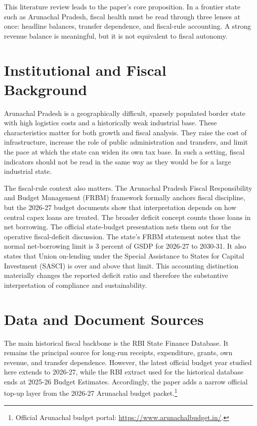 \documentclass[11pt,a4paper]{article}
\begin{document}
This literature review leads to the paper's core proposition. In a frontier state such as Arunachal Pradesh, fiscal health must be read through three lenses at once: headline balances, transfer dependence, and fiscal-rule accounting. A strong revenue balance is meaningful, but it is not equivalent to fiscal autonomy.

\section{Institutional and Fiscal Background}

Arunachal Pradesh is a geographically difficult, sparsely populated border state with high logistics costs and a historically weak industrial base. These characteristics matter for both growth and fiscal analysis. They raise the cost of infrastructure, increase the role of public administration and transfers, and limit the pace at which the state can widen its own tax base. In such a setting, fiscal indicators should not be read in the same way as they would be for a large industrial state.

The fiscal-rule context also matters. The Arunachal Pradesh Fiscal Responsibility and Budget Management (FRBM) framework formally anchors fiscal discipline, but the 2026-27 budget documents show that interpretation depends on how central capex loans are treated. The broader deficit concept counts those loans in net borrowing. The official state-budget presentation nets them out for the operative fiscal-deficit discussion. The state's FRBM statement notes that the normal net-borrowing limit is 3 percent of GSDP for 2026-27 to 2030-31. It also states that Union on-lending under the Special Assistance to States for Capital Investment (SASCI) is over and above that limit. This accounting distinction materially changes the reported deficit ratio and therefore the substantive interpretation of compliance and sustainability.

\section{Data and Document Sources}

The main historical fiscal backbone is the RBI State Finance Database. It remains the principal source for long-run receipts, expenditure, grants, own revenue, and transfer dependence. However, the latest official budget year studied here extends to 2026-27, while the RBI extract used for the historical database ends at 2025-26 Budget Estimates. Accordingly, the paper adds a narrow official top-up layer from the 2026-27 Arunachal budget packet.\footnote{Official Arunachal budget portal: \url{https://www.arunachalbudget.in/}.}
\end{document}
